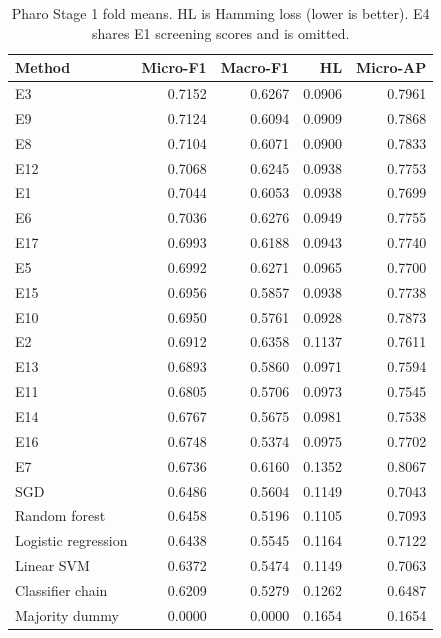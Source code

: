\begin{table}[htbp]
\centering\small
\caption{Pharo Stage 1 fold means. HL is Hamming loss (lower is better). E4 shares E1 screening scores and is omitted.}\label{tab:pharocv}
\begin{tabular}{lrrrr}\toprule
Method & Micro-F1 & Macro-F1 & HL & Micro-AP\\\midrule
E3 & 0.7152 & 0.6267 & 0.0906 & 0.7961\\
E9 & 0.7124 & 0.6094 & 0.0909 & 0.7868\\
E8 & 0.7104 & 0.6071 & 0.0900 & 0.7833\\
E12 & 0.7068 & 0.6245 & 0.0938 & 0.7753\\
E1 & 0.7044 & 0.6053 & 0.0938 & 0.7699\\
E6 & 0.7036 & 0.6276 & 0.0949 & 0.7755\\
E17 & 0.6993 & 0.6188 & 0.0943 & 0.7740\\
E5 & 0.6992 & 0.6271 & 0.0965 & 0.7700\\
E15 & 0.6956 & 0.5857 & 0.0938 & 0.7738\\
E10 & 0.6950 & 0.5761 & 0.0928 & 0.7873\\
E2 & 0.6912 & 0.6358 & 0.1137 & 0.7611\\
E13 & 0.6893 & 0.5860 & 0.0971 & 0.7594\\
E11 & 0.6805 & 0.5706 & 0.0973 & 0.7545\\
E14 & 0.6767 & 0.5675 & 0.0981 & 0.7538\\
E16 & 0.6748 & 0.5374 & 0.0975 & 0.7702\\
E7 & 0.6736 & 0.6160 & 0.1352 & 0.8067\\
SGD & 0.6486 & 0.5604 & 0.1149 & 0.7043\\
Random forest & 0.6458 & 0.5196 & 0.1105 & 0.7093\\
Logistic regression & 0.6438 & 0.5545 & 0.1164 & 0.7122\\
Linear SVM & 0.6372 & 0.5474 & 0.1149 & 0.7063\\
Classifier chain & 0.6209 & 0.5279 & 0.1262 & 0.6487\\
Majority dummy & 0.0000 & 0.0000 & 0.1654 & 0.1654\\
\bottomrule\end{tabular}
\end{table}
